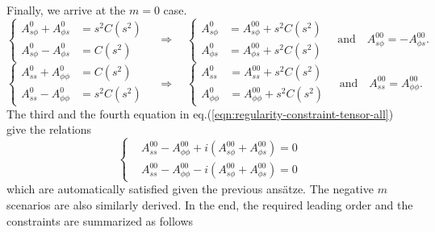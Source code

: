 \documentclass[a4paper, 11pt]{article}
\begin{document}
Finally, we arrive at the $m=0$ case.
\[
\left\{\begin{aligned}
    A_{s\phi}^0 + A_{\phi s}^0 &= s^2 C(s^2) \\ 
    A_{s\phi}^0 - A_{\phi s}^0 &= C(s^2)
\end{aligned}\right. \quad \Longrightarrow\quad 
\left\{\begin{aligned}
    A_{s\phi}^0 &= A_{s\phi}^{00} + s^2 C(s^2) \\ 
    A_{\phi s}^0 &= A_{\phi s}^{00} + s^2 C(s^2) 
\end{aligned}\right. \quad \mathrm{and} \quad A_{s\phi}^{00} = -A_{\phi s}^{00}.
\]
\[
\left\{\begin{aligned}
    A_{ss}^0 + A_{\phi \phi}^0 &= C(s^2) \\ 
    A_{ss}^0 - A_{\phi \phi}^0 &= s^2 C(s^2)
\end{aligned}\right. \quad \Longrightarrow\quad 
\left\{\begin{aligned}
    A_{ss}^0 &= A_{ss}^{00} + s^2 C(s^2) \\ 
    A_{\phi \phi}^0 &= A_{\phi\phi}^{00} + s^{2} C(s^2) 
\end{aligned}\right. \quad \mathrm{and} \quad A_{ss}^{00} = A_{\phi\phi}^{00}.
\]
The third and the fourth equation in eq.(\ref{eqn:regularity-constraint-tensor-all}) give the relations
\[
\left\{\begin{aligned}
    &A_{ss}^{00} - A_{\phi\phi}^{00} + i \left(A_{s\phi}^{00} + A_{\phi s}^{00}\right) = 0 \\ 
    &A_{ss}^{00} - A_{\phi\phi}^{00} - i \left(A_{s\phi}^{00} + A_{\phi s}^{00}\right) = 0
\end{aligned}\right.
\]
which are automatically satisfied given the previous ansätze. The negative $m$ scenarios are also similarly derived. In the end, the required leading order and the constraints are summarized as follows
\end{document}

